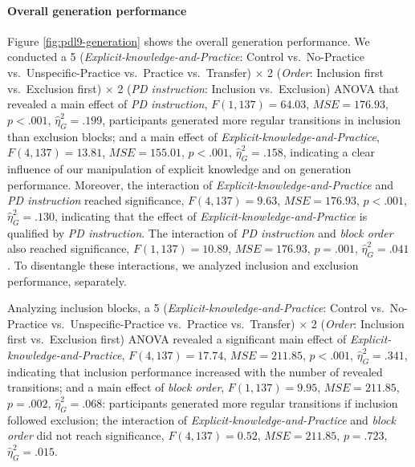 \documentclass[floatsintext,doc]{apa6}
\theoremstyle{definition}
\theoremstyle{definition}
\theoremstyle{definition}
\theoremstyle{remark}
\begin{document}
\paragraph{Overall generation
performance}\label{overall-generation-performance}

Figure \ref{fig:pdl9-generation} shows the overall generation
performance. We conducted a 5 (\emph{Explicit-knowledge-and-Practice}:
Control vs.~No-Practice vs.~Unspecific-Practice vs.~Practice
vs.~Transfer) \(\times\) 2 (\emph{Order}: Inclusion first vs.~Exclusion
first) \(\times\) 2 (\emph{PD instruction}: Inclusion vs.~Exclusion)
ANOVA that revealed a main effect of \emph{PD instruction},
\(F(1, 137) = 64.03\), \(\mathit{MSE} = 176.93\), \(p < .001\),
\(\hat{\eta}^2_G = .199\), participants generated more regular
transitions in inclusion than exclusion blocks; and a main effect of
\emph{Explicit-knowledge-and-Practice}, \(F(4, 137) = 13.81\),
\(\mathit{MSE} = 155.01\), \(p < .001\), \(\hat{\eta}^2_G = .158\),
indicating a clear influence of our manipulation of explicit knowledge
and on generation performance. Moreover, the interaction of
\emph{Explicit-knowledge-and-Practice} and \emph{PD instruction} reached
significance, \(F(4, 137) = 9.63\), \(\mathit{MSE} = 176.93\),
\(p < .001\), \(\hat{\eta}^2_G = .130\), indicating that the effect of
\emph{Explicit-knowledge-and-Practice} is qualified by \emph{PD
instruction}. The interaction of \emph{PD instruction} and \emph{block
order} also reached significance, \(F(1, 137) = 10.89\),
\(\mathit{MSE} = 176.93\), \(p = .001\), \(\hat{\eta}^2_G = .041\). To
disentangle these interactions, we analyzed inclusion and exclusion
performance, separately.

Analyzing inclusion blocks, a 5 (\emph{Explicit-knowledge-and-Practice}:
Control vs.~No-Practice vs.~Unspecific-Practice vs.~Practice
vs.~Transfer) \(\times\) 2 (\emph{Order}: Inclusion first vs.~Exclusion
first) ANOVA revealed a significant main effect of
\emph{Explicit-knowledge-and-Practice}, \(F(4, 137) = 17.74\),
\(\mathit{MSE} = 211.85\), \(p < .001\), \(\hat{\eta}^2_G = .341\),
indicating that inclusion performance increased with the number of
revealed transitions; and a main effect of \emph{block order},
\(F(1, 137) = 9.95\), \(\mathit{MSE} = 211.85\), \(p = .002\),
\(\hat{\eta}^2_G = .068\): participants generated more regular
transitions if inclusion followed exclusion; the interaction of
\emph{Explicit-knowledge-and-Practice} and \emph{block order} did not
reach significance, \(F(4, 137) = 0.52\), \(\mathit{MSE} = 211.85\),
\(p = .723\), \(\hat{\eta}^2_G = .015\).
\end{document}

